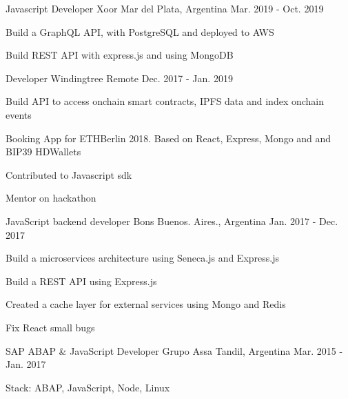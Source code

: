 \begin{cventries}
{\begin{cvitems}
\end{cvitems}
}
\cventry
{Javascript Developer} %
{Xoor} %
{Mar del Plata, Argentina} %
{Mar. 2019 - Oct. 2019} %
{ %
\begin{cvitems}
\item {Build a GraphQL API, with PostgreSQL and deployed to AWS}
\item {Build REST API with express.js and using MongoDB }
\end{cvitems}
}
\cventry
{Developer} %
{Windingtree} %
{Remote} %
{Dec. 2017 - Jan. 2019} %
{ %
\begin{cvitems}
\item {Build API to access onchain smart contracts, IPFS data and index onchain events}
\item {Booking App for ETHBerlin 2018. Based on React, Express, Mongo and and BIP39 HDWallets}
\item {Contributed to Javascript sdk}
\item {Mentor on hackathon}
\end{cvitems}
}
\cventry
{JavaScript backend developer} %
{Bons} %
{Buenos. Aires., Argentina} %
{Jan. 2017 - Dec. 2017} %
{ %
\begin{cvitems}
\item {Build a microservices architecture using Seneca.js and Express.js}
\item {Build a REST API using Express.js }
\item {Created a cache layer for external services using Mongo and Redis}
\item {Fix React small bugs}
\end{cvitems}
}
\cventry
{SAP ABAP \& JavaScript Developer} %
{Grupo Assa} %
{Tandil, Argentina} %
{Mar. 2015 - Jan. 2017} %
{ %
\begin{cvitems}
\item {Stack: ABAP, JavaScript, Node, Linux}
\end{cvitems}
}
\end{cventries}
